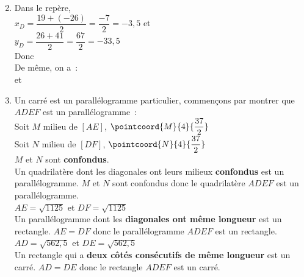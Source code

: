 \newpage

\begin{minipage}{0.45\textwidth}
\thispagestyle{vide}

\vspace*{1em}


\begin{enumerate}
	\setcounter{enumi}{1}
	\item Dans le repère,\\[1em]
			$x_D = \dfrac{19 + (-26)}{2} = \dfrac{-7}{2} = -3,5$ et\\
			$y_D = \dfrac{26 + 41}{2} = \dfrac{67}{2} = -33,5$\\[1em]
			Donc \\[1em]
			De même, on a~:\\[1em]  et 
	\item Un carré est un parallélogramme particulier, commençons par montrer que $ADEF$ est un parallélogramme~:\\
			Soit $M$ milieu de $[AE]$, $\pointcoord{M}{4}{\dfrac{37}{2}}$\\
			Soit $N$ milieu de $[DF]$, $\pointcoord{N}{4}{\dfrac{37}{2}}$\\
			$M$ et $N$ sont \textbf{confondus}.\\
			Un quadrilatère dont les diagonales ont leurs milieux \textbf{confondus} est un parallélogramme. $M$ et $N$ sont confondus donc le quadrilatère $ADEF$ est un parallélogramme.\\[1em]
			$AE = \sqrt{1125}$ et $DF = \sqrt{1125}$\\
			Un parallélogramme dont les \textbf{diagonales ont même longueur} est un rectangle. $AE = DF$ donc le parallélogramme $ADEF$ est un rectangle.\\[1em]
			$AD = \sqrt{562,5}$ et $DE = \sqrt{562,5}$\\			
			Un rectangle qui a \textbf{deux côtés consécutifs de même longueur} est un carré. $AD = DE$ donc le rectangle $ADEF$ est un carré.\\
			
			\\
\end{enumerate}

\end{minipage}

\newpage

